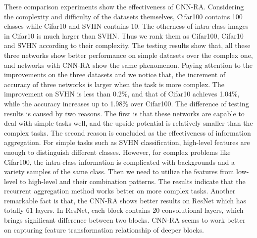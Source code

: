 \documentclass[conference]{IEEEtran}
\begin{document}
These comparison experiments show the effectiveness of CNN-RA. Considering the complexity and difficulty of the datasets themselves, Cifar100 contains 100 classes while Cifar10 and SVHN contains 10. The otherness of intra-class images in Cifar10 is much larger than SVHN. Thus we rank them as Cifar100, Cifar10 and SVHN according to their complexity. The testing results show that, all these three networks show better performance on simple datasets over the complex one, and networks with CNN-RA show the same phenomenon. Paying attention to the improvements on the three datasets and we notice that, the increment of accuracy of three networks is larger when the task is more complex. The improvement on SVHN is less than 0.2\%, and that of Cifar10 achieves 1.04\%, while the accuracy increases up to 1.98\% over Cifar100. The difference of testing results is caused by two reasons. The first is that these networks are capable to deal with simple tasks well, and the upside potential is relatively smaller than the complex tasks. The second reason is concluded as the effectiveness of information aggregation. For simple tasks such as SVHN classification, high-level features are enough to distinguish different classes. However, for complex problems like Cifar100, the intra-class information is complicated with backgrounds and a variety samples of the same class. Then we need to utilize the features from low-level to high-level and their combination patterns. The results indicate that the recurrent aggregation method works better on more complex tasks. Another remarkable fact is that, the CNN-RA shows better results on ResNet which has totally 61 layers. In ResNet, each block contains 20 convolutional layers, which brings significant difference between two blocks. CNN-RA seems to work better on capturing feature transformation relationship of deeper blocks.
\end{document}
